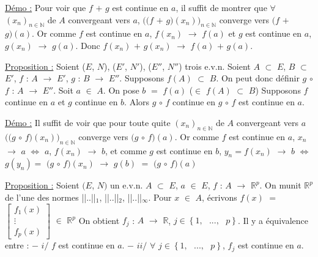 \documentclass{article}
\begin{document}
\parindent=0cm
\smallbreak
\underline{Démo :} \parindent=1cm \smallbreak Pour voir que $f$ $+$ $g$ est continue en $a$, il suffit de montrer que $\forall$ $(x_n)_{n \in \mathbb{N}}$ de $A$ convergeant vers $a$, \smallbreak $((f$ $+$ $g)(x_n))_{n \in \mathbb{N}}$ converge vers $(f$ $+$ $g)(a)$. Or comme $f$ est continue en $a$, $f(x_n)$ $\longrightarrow$ $f(a)$ \smallbreak et $g$ est continue en $a$, $g(x_n)$ $\longrightarrow$ $g(a)$. Donc $f(x_n)$ $+$ $g(x_n)$ $\longrightarrow$ $f(a)$ $+$ $g(a)$.

\parindent=0cm
\smallbreak
\underline{Proposition :} \parindent=1cm \smallbreak
Soient ($E$, $N$), ($E'$, $N'$), ($E''$, $N''$) trois e.v.n. Soient $A$ $\subset$ $E$, $B$ $\subset$ $E'$, 
$f$ : $A$ $\longrightarrow$ $E'$, $g$ : $B$ $\longrightarrow$ $E''$. \smallbreak Supposons $f(A)$ $\subset$ $B$. On peut donc définir $g$ $\circ$ $f$ : $A$ $\longrightarrow$ $E''$. Soit $a$ $\in$ $A$. On pose $b$ $=$ $f(a)$ ($\in$ $f(A)$ $\subset$ $B$) \smallbreak
Supposons $f$ continue en $a$ et $g$ continue en $b$. Alors $g$ $\circ$ $f$ continue en $g$ $\circ$ $f$ est continue en $a$.

\parindent=0cm
\smallbreak
\underline{Démo :} \parindent=1cm \smallbreak
Il suffit de voir que pour toute quite $(x_n)_{n \in \mathbb{N}}$ de $A$ convergeant vers $a$ $((g$ $\circ$ $f)(x_n))_{n \in \mathbb{N}}$  converge vers \smallbreak $(g$ $\circ$ $f)(a)$. Or comme $f$ est continue en $a$, $x_n$ $\longrightarrow$ $a$ $\Longleftrightarrow$ $a$, $f(x_n)$ $\longrightarrow$ $b$, et comme $g$ est continue en $b$, \smallbreak $y_n = f(x_n)$ $\longrightarrow$ $b$ $\Longleftrightarrow$ $g(y_n) =$ $(g$ $\circ$ $f)(x_n)$ $\longrightarrow$ $g(b)$ $=$ $(g$ $\circ$ $f)(a)$

\parindent=0cm
\smallbreak
\underline{Proposition :} \parindent=1cm \smallbreak
Soient $(E$, $N)$ un e.v.n. $A$ $\subset$ $E$, $a$ $\in$ $E$, $f$ : $A$ $\longrightarrow$ $\mathbb{R}^p$. On munit $\mathbb{R}^p$ de l'une des normes ||..||$_1$, ||..||$_2$, ||..||$_{\infty}$. \smallbreak Pour $x$ $\in$ $A$, écrivons $f(x)$ $=$ $
\begin{bmatrix}
	f_1(x) \\
	\vdots \\
	f_p(x)
\end{bmatrix}
$ $\in$ $\mathbb{R}^p$ On obtient $f_j$ : $A$ $\longrightarrow$ $\mathbb{R}$, $j \in \left\{ 1,\text{ }...,\text{ }p \right\} $. Il y a équivalence entre :
\smallbreak 
$-$ $i/$ $f$ est continue en $a$. \smallbreak
$-$ $ii/$ $\forall$ $j \in \left\{ 1,\text{ }...,\text{ }p \right\} $, $f_j$ est continue en $a$.
\end{document}
